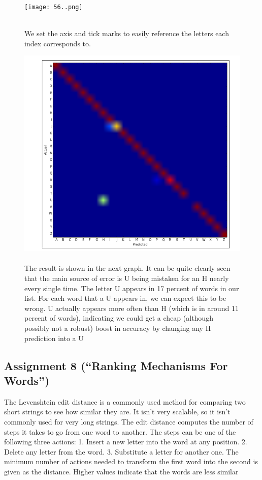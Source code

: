 \documentclass[onecolumn]{article}
\begin{document}
\newpage
\begin{figure}[h]
    \centering
    \texttt{[image: 56..png]}
\caption{\label{fig:demo-bad}
\centering
\\We set the axis and tick marks to easily reference the letters each index
corresponds to. }
\end{figure}

\begin{figure}[hb!]
    \centering
    \includegraphics[width=.8\linewidth]{aradaki graph.png}
\caption{\label{fig:demo-bad}
\centering
\\The result is shown in the next graph. It can be quite clearly seen that the main
source of error is U being mistaken for an H nearly every single time. The letter U appears in 17 percent of words in our list. For each word that a U appears in, we can expect this to be wrong. U actually appears more often than H (which is in around 11 percent of words), indicating we could get a cheap (although possibly not a robust) boost in accuracy by changing any H prediction into a U }
\end{figure}

\newpage
\subsection{Assignment 8 (``Ranking Mechanisms For Words'')}

\begin{t}
The Levenshtein edit distance is a commonly used method for comparing two short
strings to see how similar they are. It isn't very scalable, so it isn't commonly used for
very long strings. The edit distance computes the number of steps it takes to go from
one word to another. The steps can be one of the following three actions:
1. Insert a new letter into the word at any position.
2. Delete any letter from the word.
3. Substitute a letter for another one.
The minimum number of actions needed to transform the first word into the second
is given as the distance. Higher values indicate that the words are less similar
\end{t}
\end{document}
